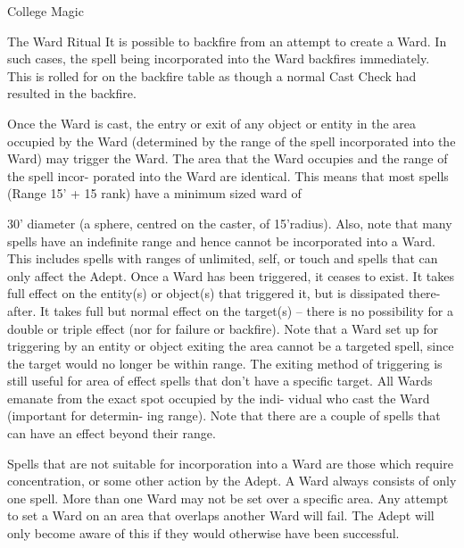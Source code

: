 \begin{Chapter}{College Magic}
\begin{ritual}{The Ward Ritual}
It is possible to backfire from an attempt to create a 
Ward.  In  such  cases,  the  spell  being  incorporated 
into the Ward backfires immediately. This is rolled 
for  on  the  backfire  table  as  though  a  normal  Cast 
Check had resulted in the backfire. 

Once  the  Ward  is  cast,  the  entry  or  exit  of  any 
object  or  entity  in  the  area  occupied  by  the  Ward 
(determined by  the  range  of  the  spell  incorporated 
into the Ward) may trigger the Ward. The area that 
the Ward occupies and the range of the spell incor-
porated  into  the  Ward  are  identical.  This  means 
that  most  spells  (Range  15’  +  15  rank)  have  a 
minimum sized ward of 

30’  diameter  (a  sphere,  centred  on  the  caster,  of 
15’radius).  Also,  note  that  many  spells  have  an 
indefinite  range  and  hence  cannot  be  incorporated 
into  a  Ward.  This  includes  spells  with  ranges  of 
unlimited,  self,  or  touch  and  spells  that  can  only 
affect the Adept. Once a Ward has been triggered, 
it ceases to exist. It takes full effect on the entity(s) 
or object(s) that triggered it, but is dissipated there-
after. It takes full but normal effect on the target(s) 
– there is no possibility for a double or triple effect 
(nor  for  failure  or  backfire).  Note  that  a  Ward  set 
up  for  triggering  by  an  entity  or  object  exiting the 
area  cannot  be  a  targeted  spell,  since  the  target 
would  no  longer  be  within  range.  The  exiting 
method of triggering is still useful for area of effect 
spells  that  don’t  have  a  specific  target.  All  Wards 
emanate from the  exact spot occupied by the indi-
vidual who cast the Ward (important for determin-
ing  range).  Note  that  there  are  a  couple  of  spells 
that can have an effect beyond their range. 

Spells that are not suitable for incorporation into a 
Ward  are  those  which  require  concentration,  or 
some  other  action  by  the  Adept.  A  Ward  always 
consists  of  only  one  spell.  More  than  one  Ward 
may not be set over a specific area. Any attempt to 
set  a  Ward  on  an  area  that  overlaps  another  Ward 
will fail. The Adept will only become aware of this 
if they would otherwise have been successful. 


\end{ritual}
\end{Chapter}
